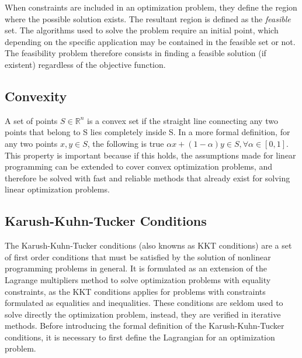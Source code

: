 When constraints are included in an optimization problem, they define the region where the possible solution exists. The resultant region is defined as the \emph{feasible} set.  The algorithms used to solve the problem require an initial point,  which depending on the specific application may be contained in the feasible set or not. The feasibility problem therefore consists in finding a feasible solution (if existent) regardless of the objective function.

\subsection{Convexity}%

A set of points $S \in \mathbb{R}^{n}$ is a convex set if the straight line connecting any two points that belong to S lies completely inside S. In a more formal definition, for any two points $x,y \in S$, the following is true $\alpha x + (1 - \alpha)y \in S, \forall \alpha \in [0,1]$. \\

This property is important because if this holds, the assumptions made for linear programming can be extended to cover convex optimization problems, and therefore be solved with fast and reliable methods that already exist for solving linear optimization problems.

\subsection{Karush-Kuhn-Tucker Conditions}%

The Karush-Kuhn-Tucker conditions (also knowns as KKT conditions) are a set of first order conditions that must be satisfied by the solution of nonlinear programming problems in general. It is formulated as an extension of the Lagrange multipliers method to solve optimization problems with equality constraints, as the KKT conditions applies for problems with constraints formulated as equalities and inequalities. These conditions are seldom used to solve directly the optimization problem, instead, they are verified in iterative methods. Before introducing the formal definition of the Karush-Kuhn-Tucker conditions, it is necessary to first define the Lagrangian for an optimization problem.\\


